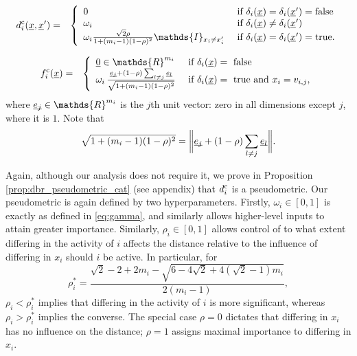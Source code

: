 \documentclass[letterpaper]{article}
\newcommand{\vect}[1]{\underline{\smash{#1}}}
\renewcommand{\v}[1]{\vect{#1}}
\newcommand{\reals}{\mathds{R}}
\newcommand{\cat}{^{\text{\textnormal{c}}}}
\newcommand{\indicator}{\ensuremath\mathds{I}}
\begin{document}
\begin{eqnarray}
\nonumber{}d\cat_i(\v{x}, \v{x}') & = & \left\{
\begin{array}{ll}
\nonumber{} 0 & \textrm{ if } \delta_i(\v{x}) = \delta_i(\v{x}') = \textrm{false}\\
\nonumber{} \omega_i & \textrm{ if } \delta_i(\v{x}) \neq \delta_i(\v{x}')\\
\nonumber{} \omega_i \frac{\sqrt{2} \rho}
{1+(m_i-1)(1-\rho)^2}
 \indicator_{x_i \neq x_i'} 
& \textrm{ if } \delta_i(\v{x}) = \delta_i(\v{x}') = \textrm{true}.
\end{array}
\right.
\end{eqnarray}

\begin{eqnarray}
\nonumber{}f\cat_i(\v{x}) & = & \left\{\begin{array}{ll}
\v{0} \in \reals^{m_i} & \textrm{ if } \delta_i(\v{x}) = \textrm{ false }\\
\nonumber{} \omega_i\,\frac{\v{e_j}+(1-\rho)\sum_{l\neq j} \v{e_l}}
{\sqrt{1+(m_i-1)(1-\rho)^2}}
 & \textrm{ if } \delta_i(\v{x}) = \textrm{ true and } x_i = v_{i,j},
\end{array}\right.
\end{eqnarray}
\noindent{}where $\v{e_j} \in \reals^{m_i}$ is the $j$th unit vector: zero in all dimensions except $j$, where it is $1$. Note that
\begin{equation}
 \sqrt{1+(m_i-1)(1-\rho)^2} = \biggl\|\v{e_j}+(1-\rho)\sum_{l\neq j} \v{e_l}\biggr\|.
\end{equation}

\noindent{}Again, although our analysis does not require it, we prove in Proposition \ref{prop:dbr_pseudometric_cat} (see appendix) that $d\cat_i$ is a pseudometric. Our pseudometric is again defined by two hyperparameters. Firstly, $\omega_i\in[0,1]$ is exactly as defined in \eqref{eq:gamma}, and similarly allows higher-level inputs to attain greater importance. Similarly, $\rho_i\in[0,1]$ allows control of to what extent differing in the activity of $i$ affects the distance relative to the influence of differing in $x_i$ should $i$ be active. In particular, for
\begin{equation}
 \rho_i^\ast = 
\frac{\sqrt{2}-2+2m_i-\sqrt{6-4\sqrt{2}+4(\sqrt{2}-1)m_i}}
{2(m_i-1)},
\end{equation}
$\rho_i<\rho_i^\ast$ implies that differing in the activity of $i$ is more significant, whereas $\rho_i>\rho_i^\ast$ implies the converse. The special case $\rho = 0$ dictates that differing in $x_i$ has no influence on the distance; $\rho=1$ assigns maximal importance to differing in $x_i$. 
\end{document}
